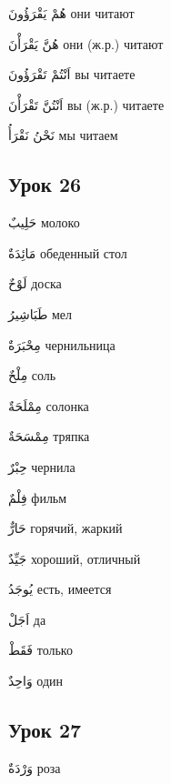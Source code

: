 \documentclass[a5paper]{article}
\newcommand\textstyleDropCaps[1]{#1}
\newcommand\textstyleCaptioncharacters[1]{#1}
\begin{document}
\textstyleCaptioncharacters{هُمْ يَقْرَؤُونَ }\textstyleDropCaps{они читают‎}

\textstyleCaptioncharacters{هُنَّ يَقْرَأْنَ }\textstyleDropCaps{они (ж.р.) чи­тают‎}

\textstyleCaptioncharacters{اَنْتُمْ تَقْرَؤُونَ }\textstyleDropCaps{вы читае­те‎}

\textstyleCaptioncharacters{اَنْتُنَّ تَقْرَأْنَ }\textstyleDropCaps{вы (ж.р.) чи­таете‎}

\textstyleCaptioncharacters{نَحْنُ نَقْرَأُ }\textstyleDropCaps{мы читаем‎}

\subsection[Урок 26‎]{\textstyleDropCaps{Урок 26‎}}
\textstyleCaptioncharacters{حَلِيبٌ }\textstyleDropCaps{молоко‎}

\textstyleCaptioncharacters{مَائِدَةٌ }\textstyleDropCaps{обеденный стол‎}

\textstyleCaptioncharacters{لَوْحٌ }\textstyleDropCaps{доска‎}

\textstyleCaptioncharacters{طَبَاشِيرُ }\textstyleDropCaps{мел‎}

\textstyleCaptioncharacters{مِحْبَرَةٌ }\textstyleDropCaps{чернильница‎}

\textstyleCaptioncharacters{مِلْحٌ }\textstyleDropCaps{соль‎}

\textstyleCaptioncharacters{مِمْلَحَةٌ }\textstyleDropCaps{солонка‎}

\textstyleCaptioncharacters{مِمْسَحَةٌ }\textstyleDropCaps{тряпка‎}

\textstyleCaptioncharacters{حِبْرٌ }\textstyleDropCaps{чернила‎}

\textstyleCaptioncharacters{فِلْمٌ }\textstyleDropCaps{фильм‎}

\textstyleCaptioncharacters{حَارٌّ }\textstyleDropCaps{горячий, жаркий‎}

\textstyleCaptioncharacters{جَيِّدٌ }\textstyleDropCaps{хороший, отличный‎}

\textstyleCaptioncharacters{يُوجَدُ }\textstyleDropCaps{есть, имеется‎}

\textstyleCaptioncharacters{اَجَلْ }\textstyleDropCaps{да‎}

\textstyleCaptioncharacters{فَقَطْ }\textstyleDropCaps{только‎}

\textstyleCaptioncharacters{وَاحِدٌ }\textstyleDropCaps{один‎}

\subsection[Урок 27‎]{\textstyleDropCaps{Урок 27‎}}
\textstyleCaptioncharacters{وَرْدَةٌ }\textstyleDropCaps{роза‎}
\end{document}
